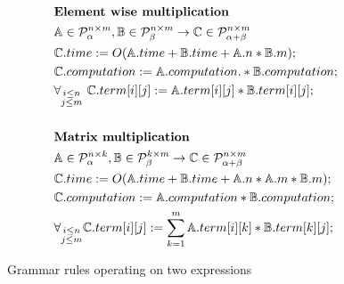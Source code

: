 \begin{figure}\label{rulestwo}
\begin{framed}
\begin{align*}
&\text{{\bf Element wise multiplication}}\\
&\mathbb{A} \in \mathcal{P}^{n \times m}_\alpha, \mathbb{B} \in \mathcal{P}^{n \times m}_\beta \rightarrow \mathbb{C} \in \mathcal{P}^{n \times m}_{\alpha + \beta} \\
&\mathbb{C}.time := O(\mathbb{A}.time + \mathbb{B}.time + \mathbb{A}.n * \mathbb{B}.m);\\
&\mathbb{C}.computation := \mathbb{A}.computation .* \mathbb{B}.computation;\\
&\forall_{\substack{i \leq n\\j \leq m}}\text{ }\mathbb{C}.term[i][j] := \mathbb{A}.term[i][j] * \mathbb{B}.term[i][j];\\
& \\
&\text{{\bf Matrix multiplication}}\\
&\mathbb{A} \in \mathcal{P}^{n \times k}_\alpha, \mathbb{B} \in \mathcal{P}^{k \times m}_\beta \rightarrow \mathbb{C} \in \mathcal{P}^{n \times m}_{\alpha + \beta} \\
&\mathbb{C}.time := O(\mathbb{A}.time + \mathbb{B}.time + \mathbb{A}.n * \mathbb{A}.m * \mathbb{B}.m);\\
&\mathbb{C}.computation := \mathbb{A}.computation * \mathbb{B}.computation;\\
&\forall_{\substack{i \leq n\\j \leq m}}\mathbb{C}.term[i][j] := \sum_{k = 1}^m \mathbb{A}.term[i][k] * \mathbb{B}.term[k][j];
\end{align*}
\caption{Grammar rules operating on two expressions}
\end{framed}
\end{figure}

